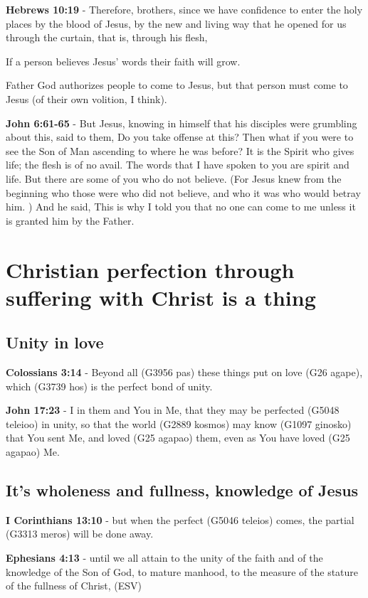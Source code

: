 \documentclass[11pt]{article}
\begin{document}
\textbf{Hebrews 10:19} - Therefore, brothers, since we have confidence to enter the holy places by the blood of Jesus, by the new and living way that he opened for us through the curtain, that is, through his flesh,

If a person believes Jesus' words their faith will grow.

Father God authorizes people to come to Jesus, but that person must come to Jesus (of their own volition, I think).

\textbf{John 6:61-65} - But Jesus, knowing in himself that his disciples were grumbling about this, said to them, Do you take offense at this?  Then what if you were to see the Son of Man ascending to where he was before?  It is the Spirit who gives life; the flesh is of no avail. The words that I have spoken to you are spirit and life.  But there are some of you who do not believe. (For Jesus knew from the beginning who those were who did not believe, and who it was who would betray him. ) And he said, This is why I told you that no one can come to me unless it is granted him by the Father.

\section{Christian perfection through suffering with Christ is a thing}
\label{sec:org3bc6457}
\subsection{Unity in love}
\label{sec:org703ace8}
\textbf{Colossians 3:14} - Beyond all (G3956 pas) these things put on love (G26 agape), which (G3739 hos) is the perfect bond of unity.

\textbf{John 17:23} - I in them and You in Me, that they may be perfected (G5048 teleioo) in unity, so that the world (G2889 kosmos) may know (G1097 ginosko) that You sent Me, and loved (G25 agapao) them, even as You have loved (G25 agapao) Me.

\subsection{It's wholeness and fullness, knowledge of Jesus}
\label{sec:org35cfb0d}
\textbf{I Corinthians 13:10} - but when the perfect (G5046 teleios) comes, the partial (G3313 meros) will be done away.

\textbf{Ephesians 4:13} - until we all attain to the unity of the faith and of the knowledge of the Son of God, to mature manhood, to the measure of the stature of the fullness of Christ, (ESV)
\end{document}
